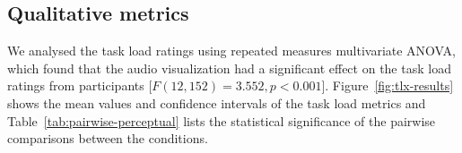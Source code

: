 


\subsection{Qualitative metrics}

We analysed the task load ratings using repeated measures multivariate ANOVA, which found that the audio visualization
had a significant effect on the task load ratings from participants [$F(12,152)=3.552, p<0.001$].
Figure~\ref{fig:tlx-results} shows the mean values and confidence intervals of the task load metrics and
Table~\ref{tab:pairwise-perceptual} lists the statistical significance of the pairwise comparisons between the conditions.

